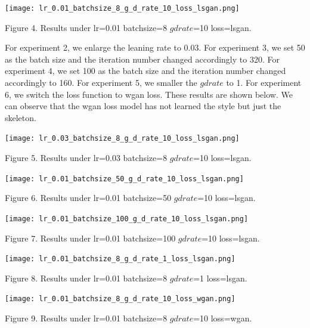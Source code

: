 \documentclass[letterpaper]{article}
\begin{document}
\begin{center}
    \texttt{[image: lr\_0.01\_batchsize\_8\_g\_d\_rate\_10\_loss\_lsgan.png]}

    Figure 4. Results under lr=0.01 batchsize=8 $gdrate$=10 loss=lsgan.
\end{center}

For experiment 2, we enlarge the leaning rate to 0.03. For experiment 3, we set 50 as the batch size and the iteration number changed accordingly to 320. For experiment 4, we set 100 as the batch size and the iteration number changed accordingly to 160. For experiment 5, we smaller the $gdrate$ to 1. For experiment 6, we switch the loss function to wgan loss. These results are shown below. We can observe that the wgan loss model has not learned the style but just the skeleton.


\begin{center}
    \texttt{[image: lr\_0.03\_batchsize\_8\_g\_d\_rate\_10\_loss\_lsgan.png]}

    Figure 5. Results under lr=0.03 batchsize=8 $gdrate$=10 loss=lsgan.
\end{center}

\begin{center}
    \texttt{[image: lr\_0.01\_batchsize\_50\_g\_d\_rate\_10\_loss\_lsgan.png]}

    Figure 6. Results under lr=0.01 batchsize=50 $gdrate$=10 loss=lsgan.
\end{center}

\begin{center}
    \texttt{[image: lr\_0.01\_batchsize\_100\_g\_d\_rate\_10\_loss\_lsgan.png]}

    Figure 7. Results under lr=0.01 batchsize=100 $gdrate$=10 loss=lsgan.
\end{center}

\begin{center}
    \texttt{[image: lr\_0.01\_batchsize\_8\_g\_d\_rate\_1\_loss\_lsgan.png]}

    Figure 8. Results under lr=0.01 batchsize=8 $gdrate$=1 loss=lsgan.
\end{center}

\begin{center}
    \texttt{[image: lr\_0.01\_batchsize\_8\_g\_d\_rate\_10\_loss\_wgan.png]}

    Figure 9. Results under lr=0.01 batchsize=8 $gdrate$=10 loss=wgan.
\end{center}
\end{document}
